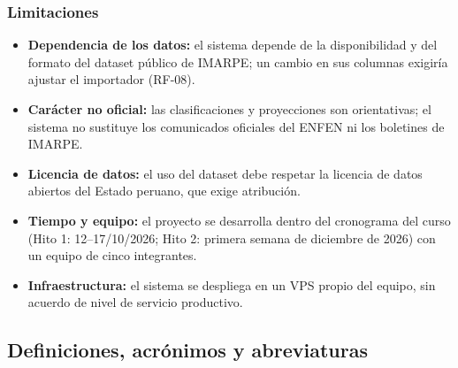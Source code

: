 \documentclass[11pt,a4paper,oneside]{article}
\begin{document}
\subsubsection{Limitaciones}

\begin{itemize}[leftmargin=1.4em, itemsep=2pt]
\item \textbf{Dependencia de los datos:} el sistema depende de la disponibilidad y del formato del dataset público de IMARPE; un cambio en sus columnas exigiría ajustar el importador (RF-08).
\item \textbf{Carácter no oficial:} las clasificaciones y proyecciones son orientativas; el sistema no sustituye los comunicados oficiales del ENFEN ni los boletines de IMARPE.
\item \textbf{Licencia de datos:} el uso del dataset debe respetar la licencia de datos abiertos del Estado peruano, que exige atribución.
\item \textbf{Tiempo y equipo:} el proyecto se desarrolla dentro del cronograma del curso (Hito 1: 12–17/10/2026; Hito 2: primera semana de diciembre de 2026) con un equipo de cinco integrantes.
\item \textbf{Infraestructura:} el sistema se despliega en un VPS propio del equipo, sin acuerdo de nivel de servicio productivo.
\end{itemize}


\subsection{Definiciones, acrónimos y abreviaturas}
\end{document}
